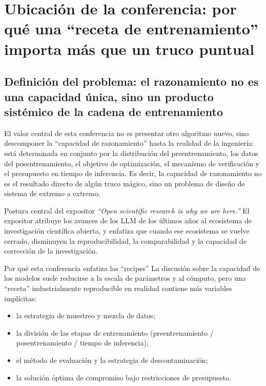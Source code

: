 \section{Ubicación de la conferencia: por qué una ``receta de entrenamiento'' importa más que un truco puntual}

\subsection{Definición del problema: el razonamiento no es una capacidad única, sino un producto sistémico de la cadena de entrenamiento}
El valor central de esta conferencia no es presentar otro algoritmo nuevo, sino descomponer la ``capacidad de razonamiento'' hasta la realidad de la ingeniería: está determinada en conjunto por la distribución del preentrenamiento, los datos del posentrenamiento, el objetivo de optimización, el mecanismo de verificación y el presupuesto en tiempo de inferencia. Es decir, la capacidad de razonamiento no es el resultado directo de algún truco mágico, sino un problema de diseño de sistema de extremo a extremo.

\begin{importantbox}{Postura central del expositor}
\textit{``Open scientific research is why we are here.''} El expositor atribuye los avances de los LLM de los últimos años al ecosistema de investigación científica abierta, y enfatiza que cuando ese ecosistema se vuelve cerrado, disminuyen la reproducibilidad, la comparabilidad y la capacidad de corrección de la investigación.
\end{importantbox}

\begin{knowledgebox}{Por qué esta conferencia enfatiza las ``recipes''}
La discusión sobre la capacidad de los modelos suele reducirse a la escala de parámetros y al cómputo, pero una ``receta'' industrialmente reproducible en realidad contiene más variables implícitas:
\begin{itemize}
    \item la estrategia de muestreo y mezcla de datos;
    \item la división de las etapas de entrenamiento (preentrenamiento / posentrenamiento / tiempo de inferencia);
    \item el método de evaluación y la estrategia de descontaminación;
    \item la solución óptima de compromiso bajo restricciones de presupuesto.
\end{itemize}
\end{knowledgebox}

